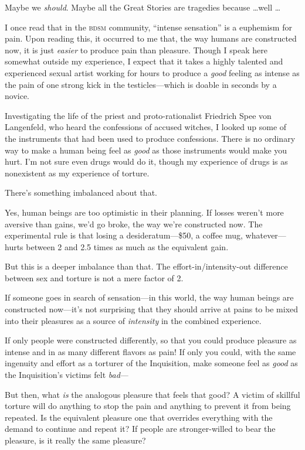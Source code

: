 {
 Maybe we \textit{should}. Maybe all the Great Stories are
tragedies because \ldots well \ldots}

{
 I once read that in the \textsc{bdsm} community, ``intense
sensation'' is a euphemism for pain. Upon reading
this, it occurred to me that, the way humans are constructed now, it is
just \textit{easier} to produce pain than pleasure. Though I speak here
somewhat outside my experience, I expect that it takes a highly
talented and experienced sexual artist working for hours to produce a
\textit{good} feeling as intense as the pain of one strong kick in the
testicles---which is doable in seconds by a novice.}

{
 Investigating the life of the priest and proto-rationalist
Friedrich Spee von Langenfeld, who heard the confessions of accused
witches, I looked up some of the instruments that had been used to
produce confessions. There is no ordinary way to make a human being
feel as \textit{good} as those instruments would make you hurt.
I'm not sure even drugs would do it, though my
experience of drugs is as nonexistent as my experience of torture.}

{
 There's something imbalanced about that.}

{
 Yes, human beings are too optimistic in their planning. If losses
weren't more aversive than gains, we'd
go broke, the way we're constructed now. The
experimental rule is that losing a desideratum---\$50, a coffee mug,
whatever---hurts between 2 and 2.5 times as much as the equivalent
gain.}

{
 But this is a deeper imbalance than that. The
effort-in/intensity-out difference between sex and torture is not a
mere factor of 2.}

{
 If someone goes in search of sensation---in this world, the way
human beings are constructed now---it's not surprising
that they should arrive at pains to be mixed into their pleasures as a
source of \textit{intensity} in the combined experience.}

{
 If only people were constructed differently, so that you could
produce pleasure as intense and in as many different flavors as pain!
If only you could, with the same ingenuity and effort as a torturer of
the Inquisition, make someone feel as \textit{good} as the
Inquisition's victims felt \textit{bad}{}---}

{
 But then, what \textit{is} the analogous pleasure that feels that
good? A victim of skillful torture will do anything to stop the pain
and anything to prevent it from being repeated. Is the equivalent
pleasure one that overrides everything with the demand to continue and
repeat it? If people are stronger-willed to bear the pleasure, is it
really the same pleasure?}

